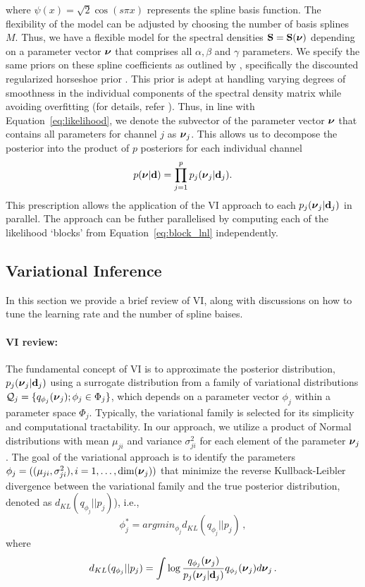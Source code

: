 \documentclass[%
 reprint,
 amsmath,amssymb,
 aps,
 nofootinbib,
]{revtex4-2}
\begin{document}
where $\psi(x) = \sqrt{2} \cos(s\pi x)$ represents the spline basis function. 
The flexibility of the model can be adjusted by choosing the number of basis splines $M$.
Thus, we have a flexible model for the spectral densities ${\bf S}={\bf S}(\mbox{\boldmath $\nu$})$ depending on a parameter vector $\mbox{\boldmath $\nu$}$  that comprises all $\alpha, \beta$ and $\gamma$ parameters. 
We specify the same priors on these spline coefficients as outlined by \citet{Hu2023}, specifically the discounted 
regularized horseshoe  prior \cite{PiironenJuho2017Siar}.
This prior is adept at handling varying degrees of smoothness in the individual components of the spectral density matrix while avoiding overfitting (for details, refer  \cite{Hu2023,PiironenJuho2017Siar}).
Thus, in line with Equation~\ref{eq:likelihood}, we denote the subvector of the parameter vector $\mbox{\boldmath $\nu$}$ that contains all parameters for channel $j$ as $\mbox{\boldmath $\nu$}_j$.
This allows us to decompose the posterior into the product of $p$ posteriors for each individual channel
\begin{align}
p(\mbox{\boldmath $\nu$}|{\bf d} )= \prod_{j=1}^p p_j(\mbox{\boldmath $\nu$}_j|{\bf d}_j).
\end{align}
This prescription allows the application of the \ac{VI} approach to each $p_j(\mbox{\boldmath $\nu$}_j|{\bf d}_j)$ in parallel. 
The approach can be futher parallelised by computing each of the likelihood `blocks' from Equation~\ref{eq:block_lnl} independently.


\subsection{Variational Inference}

In this section we provide a brief review of \ac{VI}, along with discussions on how to tune the learning rate and the number of spline baises.

\paragraph{VI review:}
The fundamental concept of \ac{VI} is to approximate the posterior distribution, $p_j(\mbox{\boldmath $\nu$}_j|{\bf d}_j)$ using a surrogate distribution from a family of variational distributions ${\cal Q}_j=\{ q_{\phi_j}(\mbox{\boldmath $\nu$}_j); \phi_j \in \Phi_j \}$, which depends on a parameter vector $\phi_j$ within a parameter space $\Phi_j$.
Typically, the variational family is selected for its simplicity and computational tractability. 
In our approach, we utilize a product of Normal distributions with mean $\mu_{ji}$ and variance $\sigma^2_{ji}$ for each element of the parameter $\mbox{\boldmath $\nu$}_j$. 
The goal of the variational approach is to identify the parameters $\phi_j=((\mu_{ji},\sigma^2_{ji}), i=1,\ldots,\mbox{dim}(\mbox{\boldmath $\nu$}_j))$ that minimize the reverse Kullback-Leibler divergence between the variational family and the true posterior distribution, denoted as $d_{KL}(q_{\phi_j}||p_j)$), i.e.,
\begin{equation}\label{eq:phi_min}
    \phi_j^*=argmin_{\phi_j} d_{KL}(q_{\phi_j}||p_j)\, , 
\end{equation}
where 
\begin{equation}
d_{KL}(q_{\phi_j}||p_j)= \int \log\frac{q_{\phi_j}(\mbox{\boldmath $\nu$}_j)}{p_j(\mbox{\boldmath $\nu$}_j|{\bf d}_j)}q_{\phi_j}(\mbox{\boldmath $\nu$}_j) d\mbox{\boldmath $\nu$}_j\, .
\end{equation}
\end{document}

